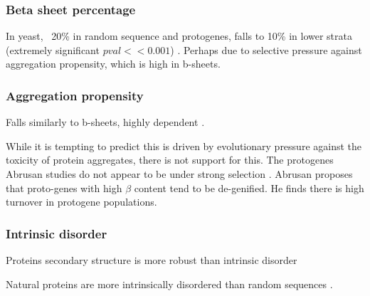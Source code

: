     \FloatBarrier

  \subsubsection{Beta sheet percentage}

    In yeast, ~20\% in random sequence and protogenes, falls to 10\% in
    lower strata (extremely significant $pval << 0.001$)
    \cite{abrusan_integration_2013}. Perhaps due to selective pressure
    against aggregation propensity, which is high in b-sheets.

  \subsubsection{Aggregation propensity}

    Falls similarly to b-sheets, highly dependent
    \cite{abrusan_integration_2013}.

    While it is tempting to predict this is driven by evolutionary
    pressure against the toxicity of protein aggregates, there is not
    support for this. The protogenes Abrusan studies do not appear to
    be under strong selection \cite{carvunis_proto-genes_2012}. Abrusan
    proposes that proto-genes with high $\beta$ content tend to be
    de-genified. He finds there is high turnover in protogene
    populations.

  \subsubsection{Intrinsic disorder}

    Proteins secondary structure is more robust than intrinsic disorder
    \cite{schaefer_protein_2010}

    Natural proteins are more intrinsically disordered than random sequences
    \cite{yu2016natural}.

